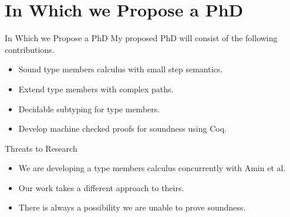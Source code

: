 \documentclass[dvipsnames]{beamer}
\begin{document}
\section{In Which we Propose a PhD}

\begin{frame}{In Which we Propose a PhD}
My proposed PhD will consist of the following contributions.
\begin{itemize}
\item
Sound type members calculus with small step semantics.
\item
Extend type members with complex paths.
\item
Decidable subtyping for type members.
\item
Develop machine checked proofs for soundness using Coq.
\end{itemize}
\end{frame}

\begin{frame}{Threats to Research}
\begin{itemize}
\item
We are developing a type members calculus concurrently with Amin et al.
\item
Our work takes a different approach to theirs.
\item
There is always a possibility we are unable to prove soundness.
\end{itemize}
\end{frame}
\end{document}

